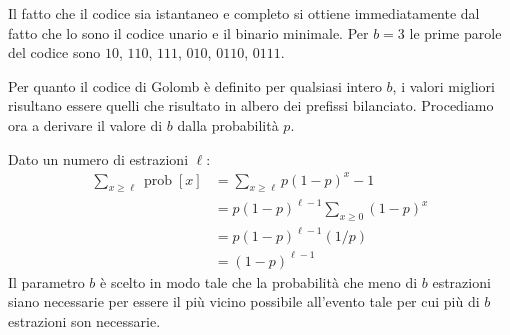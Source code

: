 \documentclass[\main/main.tex]{subfiles}
\begin{document}
\begin{multicols}{2}
\begin{definition}
\[    \]
    Il fatto che il codice sia istantaneo e completo si ottiene immediatamente dal fatto che lo sono il codice unario e il binario minimale. Per \(b=3\) le prime parole del codice sono \(10\), \(110\), \(111\), \(010\), \(0110\), \(0111\).
\end{definition}
\begin{analysis}
    Per quanto il codice di Golomb è definito per qualsiasi intero \(b\), i valori migliori risultano essere quelli che risultato in albero dei prefissi bilanciato. Procediamo ora a derivare il valore di \(b\) dalla probabilità \(p\).
    
    Dato un numero di estrazioni \(\ell\):
    \[\begin{aligned} \sum_{x \geq \ell} \operatorname{prob}[x] &=\sum_{x \geq \ell} p(1-p)^{x}-1 \\ &=p(1-p)^{\ell-1} \sum_{x \geq 0}(1-p)^{x} \\ &=p(1-p)^{\ell-1}(1 / p) \\ &=(1-p)^{\ell-1} \end{aligned}\]
    Il parametro \(b\) è scelto in modo tale che la probabilità che meno di \(b\) estrazioni siano necessarie per essere il più vicino possibile all'evento tale per cui più di \(b\) estrazioni son necessarie.
    

\end{analysis}
\end{multicols}
\end{document}
